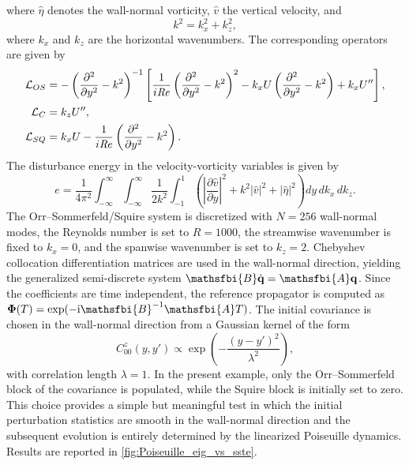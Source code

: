 where \(\hat{\eta}\) denotes the wall-normal vorticity, \(\hat{v}\) the vertical velocity, and
\begin{equation}
  k^2 = k_x^2 + k_z^2,
\end{equation}
where \(k_x\) and \(k_z\) are the horizontal wavenumbers. The corresponding operators are given by
\begin{align}
  \mathcal{L}_{OS}
  &=
  -\left(
    \frac{\partial^2}{\partial y^2}-k^2
  \right)^{-1}
  \left[
    \frac{1}{i\mathit{Re}}
    \left(
      \frac{\partial^2}{\partial y^2}-k^2
    \right)^2
    - k_x U
    \left(
      \frac{\partial^2}{\partial y^2}-k^2
    \right)
    + k_x U''
  \right], \\
  \mathcal{L}_{C}
  &= k_z U'', \\
  \mathcal{L}_{SQ}
  &= k_x U - \frac{1}{i\mathit{Re}}
  \left(
    \frac{\partial^2}{\partial y^2}-k^2
  \right).
\end{align}
The disturbance energy in the velocity-vorticity variables is given by
\begin{equation}
  e
  =
  \frac{1}{4\pi^2}
  \int_{-\infty}^{\infty}
  \int_{-\infty}^{\infty}
  \frac{1}{2k^2}
  \int_{-1}^{1}
  \left(
    \left|\frac{\partial \hat{v}}{\partial y}\right|^2
    +
    k^2 |\hat{v}|^2
    +
    |\hat{\eta}|^2
  \right)
  dy\, dk_x\, dk_z.
\end{equation}
The Orr--Sommerfeld/Squire system is discretized with \(N=256\) wall-normal modes, the Reynolds number is set to \(R=1000\), the streamwise wavenumber is fixed to \(k_x=0\), and the spanwise wavenumber is set to \(k_z=2\). Chebyshev collocation differentiation matrices are used in the wall-normal direction, yielding the generalized semi-discrete system \(\mathsfbi{B}\dot{\mathbf{q}}=\mathsfbi{A}\mathbf{q}\). Since the coefficients are time independent, the reference propagator is computed as \(\boldsymbol{\Phi}(T)=\exp(-\ii\mathsfbi{B}^{-1}\mathsfbi{A}T)\).
The initial covariance is chosen in the wall-normal direction from a Gaussian kernel of the form
\begin{equation}
  C_{00}^{z}(y,y')
  \propto
  \exp\!\left(
    -\frac{(y-y')^2}{\lambda^2}
  \right),
\end{equation}
with correlation length \(\lambda=1\). In the present example, only the Orr--Sommerfeld block of the covariance is populated, while the Squire block is initially set to zero. This choice provides a simple but meaningful test in which the initial perturbation statistics are smooth in the wall-normal direction and the subsequent evolution is entirely determined by the linearized Poiseuille dynamics. Results are reported in \cref{fig:Poiseuille_eig_vs_sste}.
